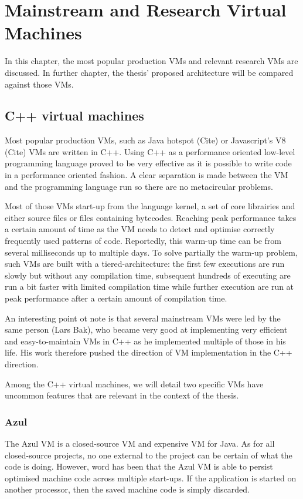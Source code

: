 \documentclass[a4paper,12pt,twoside]{../includes/ThesisStyle}
\begin{document}
\fi

\chapter{Mainstream and Research Virtual Machines}
\label{chap:stateOfTheArt}
\minitoc


In this chapter, the most popular production VMs and relevant research VMs are discussed. In further chapter, the thesis' proposed architecture will be compared against those VMs. 

\section{C++ virtual machines}

Most popular production VMs, such as Java hotspot (Cite) or Javascript's V8 (Cite) VMs are written in C++. Using C++ as a performance oriented low-level programming language proved to be very effective as it is possible to write code in a performance oriented fashion. A clear separation is made between the VM and the programming language run so there are no metacircular problems.

Most of those VMs start-up from the language kernel, a set of core librairies and either source files or files containing bytecodes. Reaching peak performance takes a certain amount of time as the VM needs to detect and optimise correctly frequently used patterns of code. Reportedly, this warm-up time can be from several milliseconds up to multiple days. To solve partially the warm-up problem, such VMs are built with a tiered-architecture: the first few executions are run slowly but without any compilation time, subsequent hundreds of executing are run a bit faster with limited compilation time while further execution are run at peak performance after a certain amount of compilation time.

An interesting point ot note is that several mainstream VMs were led by the same person (Lars Bak), who became very good at implementing very efficient and easy-to-maintain VMs in C++ as he implemented multiple of those in his life. His work therefore pushed the direction of VM implementation in the C++ direction.

Among the C++ virtual machines, we will detail two specific VMs have uncommon features that are relevant in the context of the thesis. 

\subsection{Azul}
The Azul VM \cite{Azul} is a closed-source VM and expensive VM for Java. As for all closed-source projects, no one external to the project can be certain of what the code is doing. However, word has been that the Azul VM is able to persist optimised machine code across multiple start-ups. If the application is started on another processor, then the saved machine code is simply discarded. 
\end{document}
